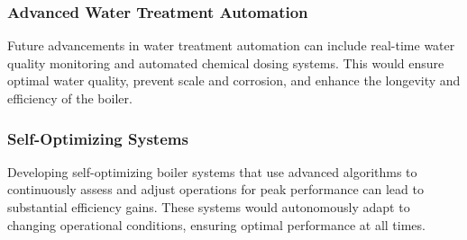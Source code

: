 \subsubsection{Advanced Water Treatment Automation}

Future advancements in water treatment automation can include real-time water quality monitoring and automated chemical dosing systems. This would ensure optimal water quality, prevent scale and corrosion, and enhance the longevity and efficiency of the boiler.

\subsubsection{Self-Optimizing Systems}

Developing self-optimizing boiler systems that use advanced algorithms to continuously assess and adjust operations for peak performance can lead to substantial efficiency gains. These systems would autonomously adapt to changing operational conditions, ensuring optimal performance at all times.
